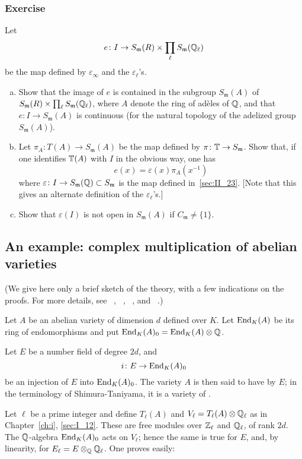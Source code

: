 \subsubsection*{Exercise}
Let 
\dpage
\[
	e \colon I \to S_\mathfrak{m}(R) \times \prod_{\ell} S_\mathfrak{m}(\mathbb{Q}_\ell)
\]
be the map defined by $\varepsilon_\infty$ and the $\varepsilon_\ell$'s.
\begin{enumerate}[a)]
\item Show that the image of $e$ is contained in the subgroup
	$S_\mathfrak{m}(A)$ of $S_\mathfrak{m}(R) \times \prod_{\ell}
	S_\mathfrak{m}(\mathbb{Q}_\ell)$, where $A$ denote the ring of adèles of $\mathbb{Q}$,
	and that $e \colon I \to S_\mathfrak{m}(A)$ is continuous (for the
	natural topology of the adelized group $S_\mathfrak{m}(A)$).
\item Let $\pi_A \colon T(A) \to S_\mathfrak{m}(A)$ be the map defined
	by $\pi \colon \mathbb{T} \to S_\mathfrak{m}$. Show that, if one
	identifies $\mathbb{T}(A)$ with $I$ in the obvious way, one has 
	\[
		e(x) = \varepsilon(x) \pi_A(x^{-1})
	\]
	where $\varepsilon \colon I \to S_\mathfrak{m}(\mathbb{Q}) \subset
	S_\mathfrak{m}$ is the map defined in~\ref{sec:II_23}. [Note that this
	gives an alternate definition of the $\varepsilon_\ell$'s.]
\item Show that $\varepsilon(I)$ is not open in $S_\mathfrak{m}(A)$ if
	$C_\mathfrak{m} \neq \{1\}$.
\end{enumerate}

\subsection{An example: complex multiplication of abelian varieties}
\label{sec:II_28}
(We give here only a brief sketch of the theory, with a few indications on the
proofs. For more details, see \citeauthor{34}~\cite{34},
\citeauthor{35}~\cite{35}, \citeauthor{41}~\cite{41}, \cite{42} and
\citeauthor{32}~\cite{32}.)

Let $A$ be an abelian variety of dimension $d$ defined over $K$.
Let $\operatorname{End}_K(A)$ be its ring of endomorphisms and put
$\operatorname{End}_K(A)_0 = \operatorname{End}_K(A) \otimes \mathbb{Q}$.

Let $E$ be a number field of degree $2d$, and
\dpage
\[
	i \colon E \to \operatorname{End}_K(A)_0
\]
be an injection of $E$ into $\operatorname{End}_K(A)_0$. The variety $A$ is then said to
have  by $E$; in the terminology of
Shimura-Taniyama, it is a variety of .

Let $\ell$ be a prime integer and define $T_\ell(A)$ and $V_\ell = T_\ell(A)
\otimes \mathbb{Q}_\ell$ as in Chapter~\ref{ch:i}, \ref{sec:I_12}. These are free
modules over $\mathbb{Z}_\ell$ and $\mathbb{Q}_\ell$, of rank $2d$. The $\mathbb{Q}$-algebra
$\operatorname{End}_K(A)_0$ acts on $V_\ell$; hence the same is true for $E$, and, by
linearity, for $E_\ell = E \otimes_{\mathbb{Q}} \mathbb{Q}_\ell$. One proves easily:

